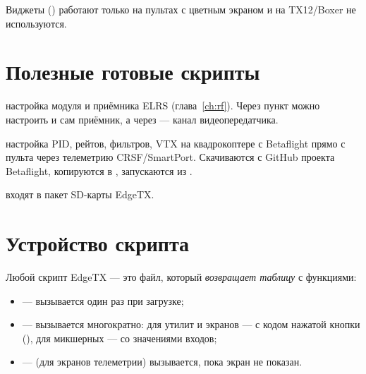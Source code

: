 Виджеты () работают только на пультах с цветным экраном и на TX12/Boxer
не используются.

\section{Полезные готовые скрипты}

\begin{description}[font=\sffamily\bfseries\color{etx}]
  \item[ExpressLRS (\code{elrsV3.lua})] настройка модуля и приёмника ELRS
        (глава~\ref{ch:rf}). Через пункт  можно настроить и сам
        приёмник, а через  --- канал видеопередатчика.
  \item[Betaflight TX Lua Scripts] настройка PID, рейтов, фильтров, VTX на квадрокоптере с
        Betaflight прямо с пульта через телеметрию CRSF/SmartPort. Скачиваются с GitHub
        проекта Betaflight, копируются в , запускаются из .
  \item[Мастера моделей] входят в пакет SD-карты EdgeTX.
\end{description}

\section{Устройство скрипта}

Любой скрипт EdgeTX --- это файл, который \emph{возвращает таблицу} с функциями:
\begin{itemize}
  \item {} --- вызывается один раз при загрузке;
  \item {} --- вызывается многократно: для утилит и экранов --- с кодом
        нажатой кнопки (), для микшерных --- со значениями входов;
  \item {} --- (для экранов телеметрии) вызывается, пока экран не показан.
\end{itemize}

